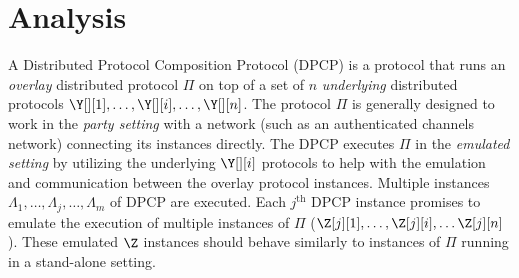 \section{Analysis}

%

\begin{definition}[Lateness]
\end{definition}

\begin{definition}[Exec]
\end{definition}

\begin{definition}[View]
\end{definition}


A Distributed Protocol Composition Protocol (DPCP) is a protocol that
runs an \emph{overlay} distributed protocol $\Pi$ on top of a set of
$n$ \emph{underlying} distributed protocols $\Y[][1], \ldots, \Y[][i], \ldots, \Y[][n]$.
The protocol $\Pi$ is generally designed
to work in the \emph{party setting} with a network (such as an authenticated channels network)
connecting its instances directly.
The DPCP executes
$\Pi$ in the \emph{emulated setting} by utilizing the underlying
$\Y[][i]$ protocols to help with the emulation and communication between the
overlay protocol instances.
Multiple instances $\Lambda_1, \ldots, \Lambda_j, \ldots, \Lambda_m$
of DPCP are executed.
Each $j^\text{th}$ DPCP instance promises to emulate the execution of multiple
instances of $\Pi$ ($\Z[j][1], \ldots, \Z[j][i], \ldots \Z[j][n]$).
These emulated $\Z$ instances should behave similarly to instances of $\Pi$
running in a stand-alone setting.

